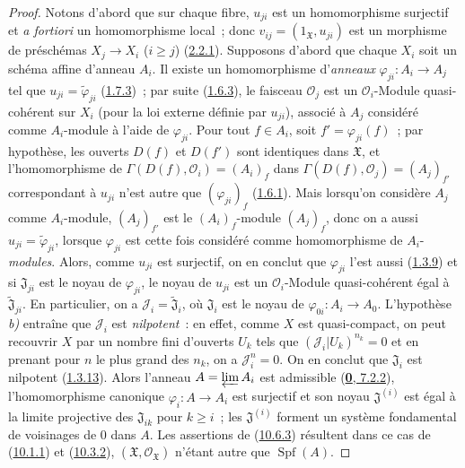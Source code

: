 \begin{proof}
Notons d'abord que sur chaque fibre, $u_{ji}$ est un homomorphisme
surjectif et \emph{a fortiori} un homomorphisme local~; donc
$v_{ij}=(1_{\mathfrak{X}},u_{ji})$ est un morphisme de préschémas
$X_j\to X_i$ ($i\geq j$) (\hyperref[I.2.2.1-fr]{2.2.1}). Supposons
d'abord que chaque $X_i$ soit un schéma affine d'anneau $A_i$. Il existe
un homomorphisme d'\emph{anneaux}
$\varphi_{ji}:A_i\to A_j$ tel que
$u_{ji}=\widetilde{\varphi}_{ji}$
(\hyperref[I.1.7.3-fr]{1.7.3})~; par suite
(\hyperref[I.1.6.3-fr]{1.6.3}), le faisceau $\mathscr{O}_j$ est un
$\mathscr{O}_i$-Module quasi-cohérent sur $X_i$ (pour la loi externe
définie par $u_{ji}$), associé à $A_j$ considéré comme $A_i$-module à
l'aide de $\varphi_{ji}$. Pour tout $f\in A_i$, soit
$f'=\varphi_{ji}(f)$~; par hypothèse, les ouverts $D(f)$ et $D(f')$ sont
identiques dans $\mathfrak{X}$, et l'homomorphisme de
$\Gamma(D(f),\mathscr{O}_i)=(A_i)_f$ dans
$\Gamma(D(f),\mathscr{O}_j)=(A_j)_{f'}$ correspondant à $u_{ji}$ n'est
autre que $(\varphi_{ji})_f$ (\hyperref[I.1.6.1-fr]{1.6.1}). Mais
lorsqu'on considère $A_j$ comme $A_i$-module, $(A_j)_{f'}$ est le
$(A_i)_f$-module $(A_j)_f$, donc on a aussi
$u_{ji}=\widetilde{\varphi}_{ji}$, lorsque $\varphi_{ji}$ est cette fois
considéré comme homomorphisme de $A_i$-\emph{modules}. Alors, comme $u_{ji}$ est
surjectif, on en conclut que $\varphi_{ji}$ l'est aussi
(\hyperref[I.1.3.9-fr]{1.3.9}) et si $\mathfrak{J}_{ji}$ est le noyau de
$\varphi_{ji}$, le noyau de $u_{ji}$ est un $\mathscr{O}_i$-Module
quasi-cohérent égal à $\widetilde{\mathfrak{J}}_{ji}$. En particulier,
on a $\mathscr{J}_i=\widetilde{\mathfrak{J}}_i$, où $\mathfrak{J}_i$ est
le noyau de $\varphi_{0i}:A_i\to A_0$. L'hypothèse \emph{b)} entraîne que
$\mathscr{J}_i$ est \emph{nilpotent}~: en effet, comme $X$
est quasi-compact, on peut recouvrir $X$ par un nombre fini
d'ouverts $U_k$ tels que $(\mathscr{J}_i|U_k)^{n_k}=0$ et en prenant pour
$n$ le plus grand des $n_k$, on a $\mathscr{J}_i^n=0$. On en conclut que
$\mathfrak{J}_i$ est nilpotent (\hyperref[I.1.3.13-fr]{1.3.13}). Alors
l'anneau $A=\varprojlim A_i$ est admissible
(\hyperref[0.7.2.2-fr]{\textbf{0}, 7.2.2}), l'homomorphisme canonique
$\varphi_i:A\to A_i$ est surjectif et son noyau
$\mathfrak{J}^{(i)}$ est égal à la limite projective des
$\mathfrak{J}_{ik}$ pour $k\geq i$~; les $\mathfrak{J}^{(i)}$ forment
un système fondamental de voisinages de 0 dans $A$. Les assertions de
(\hyperref[I.10.6.3-fr]{10.6.3}) résultent dans ce cas de
(\hyperref[I.10.1.1-fr]{10.1.1}) et
(\hyperref[I.10.3.2-fr]{10.3.2}),
$(\mathfrak{X},\mathscr{O}_{\mathfrak{X}})$ n'étant autre que
$\operatorname{Spf}(A)$.


\end{proof}
